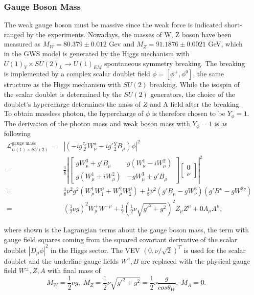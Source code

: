 \subsubsection{Gauge Boson Mass}
The weak gauge boson must be massive since the weak force is indicated short-ranged by the experiments. Nowadays, the masses of W, Z boson have been measured as $M_W =80.379\pm 0.012 $ Gev and $M_Z=91.1876\pm0.0021$ GeV, which in the GWS model is generated by the Higgs mechanism with $U(1)_Y \times SU(2)_L \to U(1)_{EM}$ spontaneous symmetry breaking. The breaking is implemented by a complex scalar doublet field $\phi = [\phi^+, \phi^0]$, the same structure as the Higgs mechanism with $SU(2)$ breaking. While the isospin of the scalar doublet is determined by the $SU(2)$ generators, the choice of the doublet's hypercharge determines the mass of $Z$ and A field after the breaking. To obtain massless photon, the hypercharge of $\phi$ is therefore chosen to be $Y_{\phi} = 1$. The derivation of the photon mass and weak boson mass with $Y_{\phi} = 1$ is as following 
\begin{equation}
\begin{split}
    \mathcal{L}_{U(1)\times SU(2)}^{\text{gauge mass}} 
    =& \left\lvert  (-ig\frac{\tau_a}{2} W_\mu^a - ig'\frac{Y}{2}B_\mu ) \phi \right\rvert^2 \\ 
    = & \frac{1}{8} \left\lvert 
        \begin{bmatrix} 
             gW_\mu^3 + g'B_\mu & g(W^1_\mu-iW^2_\mu) \\
            g(W^1_\mu+iW^2_\mu) & -gW_\mu^3 + g'B_\mu 
        \end{bmatrix}
        \begin{bmatrix} 0 \\ \nu \end{bmatrix} \right\rvert^2 \\
    = & \frac{1}{8}\nu^2g^2 (W^1_\mu W^\mu_1 +W^2_\mu W^\mu_2) + \frac{1}{8}\nu^2(g'B_\mu-gW^3_\nu)(g'B^\mu-gW^{3\nu}) \\
    = &  (\frac{1}{2}\nu g)^2 W^+_\mu W^{-\mu} +  \frac{1}{2} (\frac{1}{2}\nu \sqrt{g'^2+g^2})^2 Z_\mu Z^\mu + 0 A_\mu A^\mu ,
\end{split}
\label{eqn:relatedWorks:qft:gws:gaugeMassLagragian}
\end{equation}

\noindent where shown is the Lagrangian terms about the gauge boson mass, the term with gauge field squares coming from the squared covariant derivative of the scalar doublet $|D_\mu \phi|^2$ in the Higgs sector. The VEV $ (0, \nu/\sqrt{2})^T$ is used for the scalar doublet and the underline gauge fields $W^a, B$  are replaced with the physical gauge field $W^\pm, Z, A$ with final mass of
\begin{equation}
    M_W = \frac{1}{2}\nu g, \; M_Z = \frac{1}{2}\nu \sqrt{g'^2+g^2}= \frac{1}{2}\nu \frac{g}{cos\theta_W}, \;  M_A= 0 . \; 
\end{equation}

